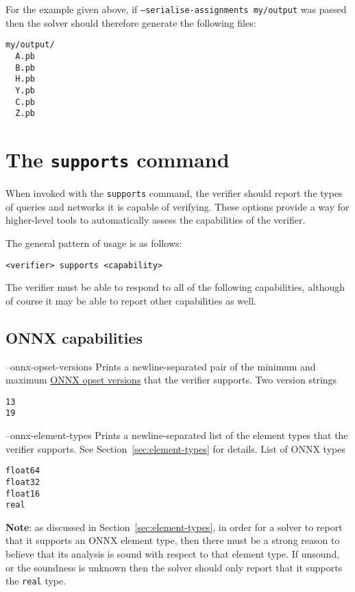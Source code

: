 For the example given above, if \texttt{--serialise-assignments my/output} was passed then the solver should therefore generate the following files:
\begin{lstlisting}[style=bash]
my/output/
  A.pb
  B.pb
  H.pb
  Y.pb
  C.pb
  Z.pb
\end{lstlisting}

\section{The \texttt{supports} command}
\label{sec:global_capabilities}

When invoked with the \texttt{supports} command, the verifier should report the types of queries and networks it is capable of verifying.
These options provide a way for higher-level tools to automatically assess the capabilities of the verifier.

The general pattern of usage is as follows:
\begin{lstlisting}[style=bash]
<verifier> supports <capability>
\end{lstlisting}
The verifier must be able to respond to all of the following capabilities, although of course it may be able to report other capabilities as well.

\subsection{ONNX capabilities}

\clOutputOption
{--onnx-opset-versions}
{Prints a newline-separated pair of the minimum and maximum \href{https://onnxruntime.ai/docs/reference/compatibility.html\#onnx-opset-support}{ONNX opset versions} that the verifier supports.}
{Two version strings}
\begin{lstlisting}[style=bash]
%*\exampleVerifier* supports --onnx-opset-versions
13
19
\end{lstlisting}

\clOutputOption
{--onnx-element-types}
{Prints a newline-separated list of the element types that the verifier supports. See Section~\ref{sec:element-types} for details.}
{List of ONNX types}
\begin{lstlisting}[style=bash]
%*\exampleVerifier* supports --onnx-element-types
float64
float32
float16
real
\end{lstlisting}
\textbf{Note}: as discussed in Section~\ref{sec:element-types}, in order for a solver to report that it supports an ONNX element type, then there must be a strong reason to believe that its analysis is sound with respect to that element type. If unsound, or the soundness is unknown then the solver should only report that it supports the \texttt{real} type.


